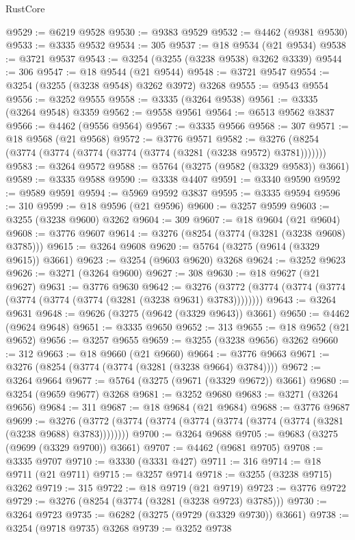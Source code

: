 \begin{lexlean}{RustCore}
\begin{coremodule}
@9529 := @6219 @9528
@9530 := @9383 @9529
@9532 := @4462 (@9381 @9530)
@9533 := @3335 @9532
@9534 := 305
@9537 := @18 @9534 (@21 @9534)
@9538 := @3721 @9537
@9543 := @3254 (@3255 (@3238 @9538) @3262 @3339)
@9544 := 306
@9547 := @18 @9544 (@21 @9544)
@9548 := @3721 @9547
@9554 := @3254 (@3255 (@3238 @9548) @3262 @3972) @3268
@9555 := @9543 @9554
@9556 := @3252 @9555
@9558 := @3335 (@3264 @9538)
@9561 := @3335 (@3264 @9548) @3359
@9562 := @9558 @9561
@9564 := @6513 @9562 @3837
@9566 := @4462 (@9556 @9564)
@9567 := @3335 @9566
@9568 := 307
@9571 := @18 @9568 (@21 @9568)
@9572 := @3776 @9571
@9582 := @3276 (@8254 (@3774 (@3774 (@3774 (@3774 (@3774 (@3281 (@3238 @9572) @3781)))))))
@9583 := @3264 @9572
@9588 := @5764 (@3275 (@9582 (@3329 @9583)) @3661)
@9589 := @3335 @9588
@9590 := @3338 @4407
@9591 := @3340 @9590
@9592 := @9589 @9591
@9594 := @5969 @9592 @3837
@9595 := @3335 @9594
@9596 := 310
@9599 := @18 @9596 (@21 @9596)
@9600 := @3257 @9599
@9603 := @3255 (@3238 @9600) @3262
@9604 := 309
@9607 := @18 @9604 (@21 @9604)
@9608 := @3776 @9607
@9614 := @3276 (@8254 (@3774 (@3281 (@3238 @9608) @3785)))
@9615 := @3264 @9608
@9620 := @5764 (@3275 (@9614 (@3329 @9615)) @3661)
@9623 := @3254 (@9603 @9620) @3268
@9624 := @3252 @9623
@9626 := @3271 (@3264 @9600)
@9627 := 308
@9630 := @18 @9627 (@21 @9627)
@9631 := @3776 @9630
@9642 := @3276 (@3772 (@3774 (@3774 (@3774 (@3774 (@3774 (@3774 (@3281 (@3238 @9631) @3783))))))))
@9643 := @3264 @9631
@9648 := @9626 (@3275 (@9642 (@3329 @9643)) @3661)
@9650 := @4462 (@9624 @9648)
@9651 := @3335 @9650
@9652 := 313
@9655 := @18 @9652 (@21 @9652)
@9656 := @3257 @9655
@9659 := @3255 (@3238 @9656) @3262
@9660 := 312
@9663 := @18 @9660 (@21 @9660)
@9664 := @3776 @9663
@9671 := @3276 (@8254 (@3774 (@3774 (@3281 (@3238 @9664) @3784))))
@9672 := @3264 @9664
@9677 := @5764 (@3275 (@9671 (@3329 @9672)) @3661)
@9680 := @3254 (@9659 @9677) @3268
@9681 := @3252 @9680
@9683 := @3271 (@3264 @9656)
@9684 := 311
@9687 := @18 @9684 (@21 @9684)
@9688 := @3776 @9687
@9699 := @3276 (@3772 (@3774 (@3774 (@3774 (@3774 (@3774 (@3774 (@3281 (@3238 @9688) @3783))))))))
@9700 := @3264 @9688
@9705 := @9683 (@3275 (@9699 (@3329 @9700)) @3661)
@9707 := @4462 (@9681 @9705)
@9708 := @3335 @9707
@9710 := @3330 (@3331 @427)
@9711 := 316
@9714 := @18 @9711 (@21 @9711)
@9715 := @3257 @9714
@9718 := @3255 (@3238 @9715) @3262
@9719 := 315
@9722 := @18 @9719 (@21 @9719)
@9723 := @3776 @9722
@9729 := @3276 (@8254 (@3774 (@3281 (@3238 @9723) @3785)))
@9730 := @3264 @9723
@9735 := @6282 (@3275 (@9729 (@3329 @9730)) @3661)
@9738 := @3254 (@9718 @9735) @3268
@9739 := @3252 @9738

\end{coremodule}
\end{lexlean}
